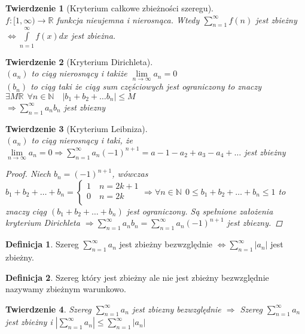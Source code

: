 \documentclass[12pt,a4paper]{article}
\newtheorem{tw}{Twierdzenie}
\theoremstyle{definition}
\newtheorem{df}{Definicja}
\begin{document}
\begin{tw}[Kryterium całkowe zbieżności szeregu]~\\
$f: [1, \infty) \to \mathbb{R}$ funkcja nieujemna i nierosnąca. Wtedy 
$\sum\limits_{n=1}^\infty f(n)$ jest zbieżny $\Leftrightarrow \int\limits_{n=1}^\infty f(x)dx$ jest zbieżna.
\end{tw}

\begin{tw}[Kryterium Dirichleta]~\\
$(a_n)$ to ciąg nierosnący i takiże $\lim\limits_{n\to\infty} a_n = 0$\\
$(b_n)$ to ciąg taki że ciąg sum częściowych jest ograniczony to znaczy 
$\exists M\mathbb{R} ~~ \forall n\in\mathbb{N} \quad |b_1 + b_2 + \dots b_n| \leqslant M$\\
$\Rightarrow \sum\limits_{n=1}^\infty a_nb_n$ jest zbiezny
\end{tw}

\begin{tw}[Kryterium Leibniza]~\\
$(a_n)$ to ciąg nierosnący i taki, że $\lim\limits_{n\to\infty} a_n = 0 \Rightarrow \sum\limits_{n=1}^\infty a_n(-1)^{n+1} = a-1 - a_2 + a_3 - a_4 + \dots$ jest zbieżny
\begin{proof}
Niech $b_n = (-1)^{n+1}$, wówczas $b_1 + b_2 + \dots + b_n = 
	\begin{cases}
		1 \quad n=2k+1\\
		0 \quad n=2k\\
 	\end{cases}
\Rightarrow \forall n\in\mathbb{N} ~~ 0\leqslant b_1 + b_2 + \dots + b_n \leqslant 1$ to znaczy ciąg $(b_1 + b_2 + \dots + b_n)$ jest ograniczony. Są spełnione założenia kryterium Dirichleta $\Rightarrow \sum\limits_{n=1}^\infty a_nb_n = \sum\limits_{n=1}^\infty a_n(-1)^{n+1}$ jest zbiezny. 
\end{proof}
\end{tw}

\begin{df}
Szereg $\sum\limits_{n=1}^\infty a_n$ jest zbieżny bezwzględnie $\Leftrightarrow \sum\limits_{n=1}^\infty |a_n|$ jest zbieżny.
\end{df}

\begin{df}
Szereg który jest zbieżny ale nie jest zbieżny bezwzględnie nazywamy zbieżnym warunkowo.
\end{df}

\begin{tw}
Szereg $\sum\limits_{n=1}^\infty a_n$ jest zbiezny bezwzględnie $\Rightarrow$ Szereg $\sum\limits_{n=1}^\infty a_n$ jest zbieżny i $|\sum\limits_{n=1}^\infty a_n| \leqslant \sum\limits_{n=1}^\infty |a_n|$ 
\end{tw}

\end{document}
